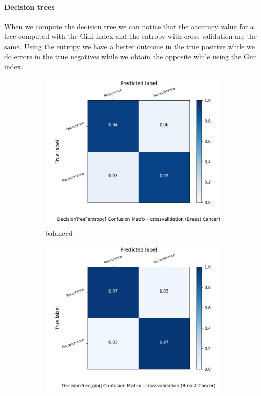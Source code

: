 \documentclass{article}
\begin{document}
\paragraph{Decision trees}
When we compute the decision tree we can notice that the  accuracy value for a tree computed with the Gini index and the entropy  with cross validation are the same. Using the entropy we have a better outcome in the true positive while we do errors in the true negatives while we obtain the opposite while using the Gini index.


\begin{figure}[H]
	\centering
	\begin{subfigure}{.5\textwidth}
		\centering
		\includegraphics[width=1.1\textwidth]{Plots/breastCancer_DecisionTree_entropy_balance_True_crossvalidation.png}
		\caption{balanced}
	\end{subfigure}%
	\begin{subfigure}{.5\textwidth}
		\centering
		\includegraphics[width=1.1\textwidth]{Plots/breastCancer_DecisionTree_gini_balance_True_crossvalidation.png}

\end{subfigure}
\end{figure}
\end{document}
